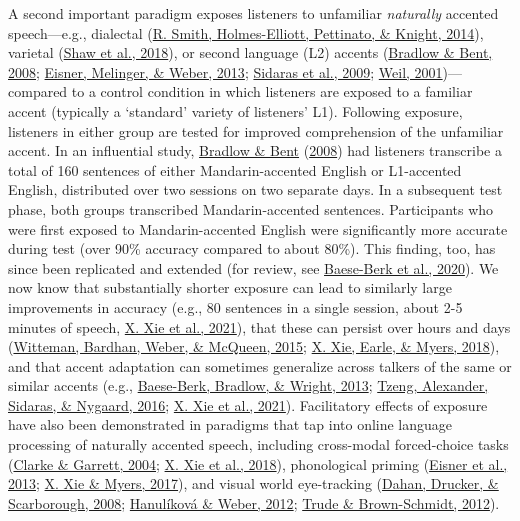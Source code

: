 \documentclass[
  11pt,
  english,
  man,floatsintext]{apa6}
\begin{document}
A second important paradigm exposes listeners to unfamiliar \emph{naturally} accented speech---e.g., dialectal (\protect\hyperlink{ref-smith2014}{R. Smith, Holmes-Elliott, Pettinato, \& Knight, 2014}), varietal (\protect\hyperlink{ref-shaw2018}{Shaw et al., 2018}), or second language (L2) accents (\protect\hyperlink{ref-bradlow-bent2008}{Bradlow \& Bent, 2008}; \protect\hyperlink{ref-eisner2013}{Eisner, Melinger, \& Weber, 2013}; \protect\hyperlink{ref-sidaras2009}{Sidaras et al., 2009}; \protect\hyperlink{ref-weil2001a}{Weil, 2001})---compared to a control condition in which listeners are exposed to a familiar accent (typically a `standard' variety of listeners' L1). Following exposure, listeners in either group are tested for improved comprehension of the unfamiliar accent. In an influential study, \protect\hyperlink{ref-bradlow-bent2008}{Bradlow \& Bent} (\protect\hyperlink{ref-bradlow-bent2008}{2008}) had listeners transcribe a total of 160 sentences of either Mandarin-accented English or L1-accented English, distributed over two sessions on two separate days. In a subsequent test phase, both groups transcribed Mandarin-accented sentences. Participants who were first exposed to Mandarin-accented English were significantly more accurate during test (over 90\% accuracy compared to about 80\%). This finding, too, has since been replicated and extended (for review, see \protect\hyperlink{ref-baeseberk2020}{Baese-Berk et al., 2020}). We now know that substantially shorter exposure can lead to similarly large improvements in accuracy (e.g., 80 sentences in a single session, about 2-5 minutes of speech, \protect\hyperlink{ref-xie2021jep}{X. Xie et al., 2021}), that these can persist over hours and days (\protect\hyperlink{ref-witteman2015}{Witteman, Bardhan, Weber, \& McQueen, 2015}; \protect\hyperlink{ref-xie2018lcn}{X. Xie, Earle, \& Myers, 2018}), and that accent adaptation can sometimes generalize across talkers of the same or similar accents (e.g., \protect\hyperlink{ref-baeseberk2013}{Baese-Berk, Bradlow, \& Wright, 2013}; \protect\hyperlink{ref-tzeng2016}{Tzeng, Alexander, Sidaras, \& Nygaard, 2016}; \protect\hyperlink{ref-xie2021jep}{X. Xie et al., 2021}). Facilitatory effects of exposure have also been demonstrated in paradigms that tap into online language processing of naturally accented speech, including cross-modal forced-choice tasks (\protect\hyperlink{ref-clarke-garrett2004}{Clarke \& Garrett, 2004}; \protect\hyperlink{ref-xie2018jasa}{X. Xie et al., 2018}), phonological priming (\protect\hyperlink{ref-eisner2013}{Eisner et al., 2013}; \protect\hyperlink{ref-xie2017}{X. Xie \& Myers, 2017}), and visual world eye-tracking (\protect\hyperlink{ref-dahan2008}{Dahan, Drucker, \& Scarborough, 2008}; \protect\hyperlink{ref-hanulikova-weber2012}{Hanulíková \& Weber, 2012}; \protect\hyperlink{ref-trude2012talker}{Trude \& Brown-Schmidt, 2012}).
\end{document}
